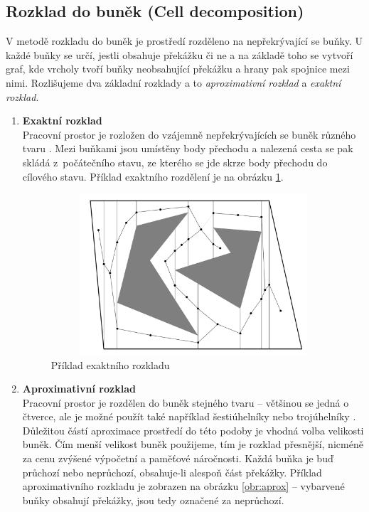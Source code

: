 \subsection{Rozklad do buněk (Cell decomposition)}
V metodě rozkladu do buněk je prostředí rozděleno na nepřekrývající se
buňky. U každé buňky se určí, jestli obsahuje překážku či ne a na základě toho se vytvoří graf, kde vrcholy tvoří buňky neobsahující překážku a hrany pak spojnice mezi nimi. Rozlišujeme dva základní rozklady a to \textit{aproximativní rozklad} a \textit{exaktní rozklad}.
	\begin{enumerate}
		\item \textbf{Exaktní rozklad}\\
		Pracovní prostor je rozložen do vzájemně nepřekrývajících se buněk různého tvaru \cite{LaValle2006}. Mezi buňkami jsou umístěny body přechodu a nalezená cesta se pak skládá z~počátečního stavu, ze kterého se jde skrze body přechodu do cílového stavu. Příklad exaktního rozdělení je na obrázku \ref{obr:exact}.
		
		\begin{figure}[h!]
			\begin{center}
				\includegraphics*[width=15cm,height=6cm,keepaspectratio]{obr/exact}
			\end{center}
			\caption{Příklad exaktního rozkladu \cite{LaValle2006}}
			\label{obr:exact}
		\end{figure}
		
		\item \textbf{Aproximativní rozklad}\\
		Pracovní prostor je rozdělen do buněk stejného tvaru -- většinou se jedná o čtverce, ale je možné použít také například šestiúhelníky nebo trojúhelníky \cite{Abd Algfoor2015}. Důležitou částí aproximace prostředí do této podoby je vhodná volba velikosti buněk. Čím menší velikost buněk použijeme, tím je rozklad přesnější, nicméně za cenu zvýšené výpočetní a paměťové náročnosti. Každá buňka je buď průchozí nebo neprůchozí, obsahuje-li alespoň část překážky. Příklad aproximativního rozkladu je zobrazen na obrázku \ref{obr:aprox} -- vybarvené buňky obsahují překážky, jsou tedy označené za neprůchozí.
		

\end{enumerate}

